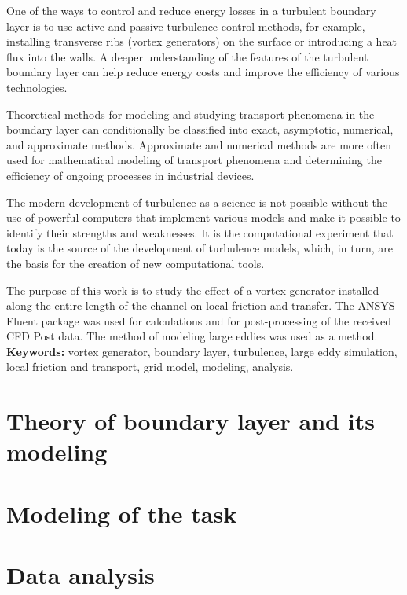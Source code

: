 \documentclass[12pt, a4paper]{article}
\begin{document}
	One of the ways to control and reduce energy losses in a turbulent boundary layer is to use active and passive turbulence control methods, for example, installing transverse ribs (vortex generators) on the surface or introducing a heat flux into the walls. A deeper understanding of the features of the turbulent boundary layer can help reduce energy costs and improve the efficiency of various technologies.
	
	Theoretical methods for modeling and studying transport phenomena in the boundary layer can conditionally be classified into exact, asymptotic, numerical, and approximate methods. Approximate and numerical methods are more often used for mathematical modeling of transport phenomena and determining the efficiency of ongoing processes in industrial devices.
	
	The modern development of turbulence as a science is not possible without the use of powerful computers that implement various models and make it possible to identify their strengths and weaknesses. It is the computational experiment that today is the source of the development of turbulence models, which, in turn, are the basis for the creation of new computational tools.
	
	The purpose of this work is to study the effect of a vortex generator installed along the entire length of the channel on local friction and transfer. The ANSYS Fluent package was used for calculations and for post-processing of the received CFD Post data. The method of modeling large eddies was used as a method.\\
	
	\textbf{Keywords:} vortex generator, boundary layer, turbulence, large eddy simulation, local friction and transport, grid model, modeling, analysis.\\	
	\newpage
	\section{Theory of boundary layer and its modeling}
	
	\newpage
	\section{Modeling of the task}
	
	\newpage
	\section{Data analysis}
	
	\newpage
	
	\newpage
	\printbibliography
	\newpage
	
	\newpage
	
\end{document}
